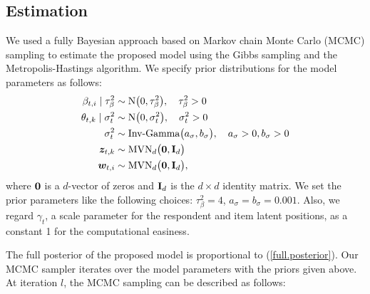 \documentclass[a4paper, 11pt]{report}
\begin{document}
\begin{itemize}
\chapter{Estimation} \label{Chapter5}
We used a fully Bayesian approach based on Markov chain Monte Carlo (MCMC) sampling to estimate the proposed model using the Gibbs sampling and the Metropolis-Hastings algorithm. We specify prior distributions for the model parameters as follows:
\[\begin{split}
    \beta_{t,i} \mid \tau_{\beta}^2 &\sim \mbox{N}\big(0, \tau_{\beta}^2\big), \quad \tau_{\beta}^2 > 0 \\
    \theta_{t,k} \mid \sigma^2_t &\sim \mbox{N}\big(0, \sigma_t^2\big), \quad \sigma_t^2 > 0 \\
    \sigma_t^2 &\sim \mbox{Inv-Gamma}\big(a_{\sigma}, b_{\sigma}\big), \quad a_{\sigma} > 0, b_{\sigma} > 0 \\
    \boldsymbol{z}_{t,k} &\sim \mbox{MVN}_d\big({\bf 0}, {\bf I}_d\big)\\
    \boldsymbol{w}_{t,i} &\sim \mbox{MVN}_d\big({\bf 0}, {\bf I}_d\big),\\
\end{split}\]
where ${\bf 0}$ is a $d$-vector of zeros and ${\bf I}_d$ is the $d \times d$ identity matrix. We set the prior parameters like the following choices: $\tau_{\beta}^2 = 4$, $a_{\sigma} = b_{\sigma} = 0.001$. Also, we regard $\gamma_t$, a scale parameter for the respondent and item latent positions, as a constant 1 for the computational easiness.

\quad The full posterior of the proposed model is proportional to (\ref{full.posterior}). Our MCMC sampler iterates over the model parameters with the priors given above. At iteration $l$, the MCMC sampling can be described as follows:


\end{itemize}
\end{document}
